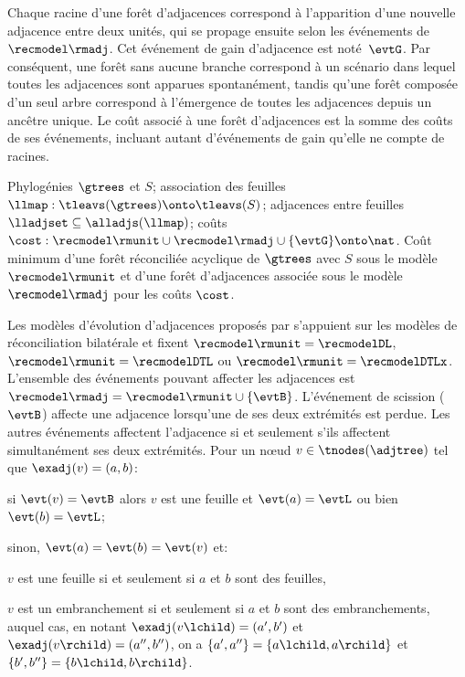 Chaque racine d’une forêt d’adjacences correspond à l’apparition d’une nouvelle adjacence entre deux unités, qui se propage ensuite selon les événements de \(\recmodel\rmadj\).
Cet événement de gain d’adjacence est noté~\(\evtG\).
Par conséquent, une forêt sans aucune branche correspond à un scénario dans lequel toutes les adjacences sont apparues spontanément, tandis qu’une forêt composée d’un seul arbre correspond à l’émergence de toutes les adjacences depuis un ancêtre unique.
Le coût associé à une forêt d’adjacences est la somme des coûts de ses événements, incluant autant d’événements de gain qu’elle ne compte de racines.

    {Phylogénies \(\gtrees\) et \(S\);
     association des feuilles \(\llmap : \tleavs(\gtrees) \onto \tleavs(S)\);
     adjacences entre feuilles \(\lladjset \subseteq \alladjs(\llmap)\);
     coûts \(\cost : \recmodel\rmunit \cup \recmodel\rmadj \cup \{\evtG\} \onto \nat\).}
    {Coût minimum d’une forêt réconciliée acyclique de \(\gtrees\) avec \(S\) sous le modèle \(\recmodel\rmunit\)
     et d’une forêt d’adjacences associée sous le modèle \(\recmodel\rmadj\)
 pour les coûts \(\cost\).}

Les modèles d’évolution d’adjacences proposés par \textcite{Berard2012EvolutionGeneNeighborhoods,Patterson2013LateralGeneTransfer,Duchemin2017DecostarReconstructingAncestral} s’appuient sur les modèles de réconciliation bilatérale et fixent \(\recmodel\rmunit = \recmodelDL\), \(\recmodel\rmunit = \recmodelDTL\) ou \(\recmodel\rmunit = \recmodelDTLx\).
L’ensemble des événements pouvant affecter les adjacences est \(\recmodel\rmadj = \recmodel\rmunit \cup \{\evtB\}\).
L’événement de scission (\(\evtB\)) affecte une adjacence lorsqu’une de ses deux extrémités est perdue.
Les autres événements affectent l’adjacence si et seulement s’ils affectent simultanément ses deux extrémités.
Pour un nœud \(v \in \tnodes(\adjtree)\) tel que \(\exadj(v) = (a, b)\):
\begin{compactitemize}
    \item si \(\evt(v) = \evtB\) alors \(v\) est une feuille et \(\evt(a) = \evtL\) ou bien \(\evt(b) = \evtL\);
    \item sinon, \(\evt(a) = \evt(b) = \evt(v)\) et:
    \begin{compactitemize}
        \item \(v\) est une feuille si et seulement si \(a\) et \(b\) sont des feuilles,
        \item \(v\) est un embranchement si et seulement si \(a\) et \(b\) sont des embranchements, auquel cas, en notant
            \(\exadj(v\lchild) = (a', b')\) et \(\exadj(v\rchild) = (a'', b'')\), on a
            \(\{a', a''\} = \{a\lchild, a\rchild\}\) et \(\{b', b''\} = \{b\lchild, b\rchild\}\).
    \end{compactitemize}
\end{compactitemize}

